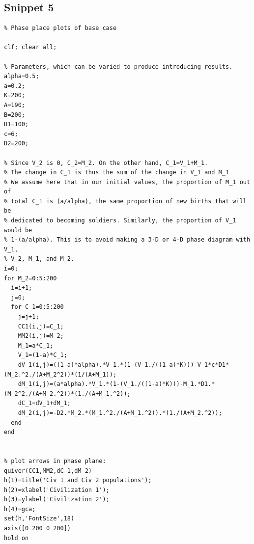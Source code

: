 \documentclass[12pt]{article}
\begin{document}
\subsection{Snippet 5}
\begin{verbatim}
% Phase place plots of base case

clf; clear all;

% Parameters, which can be varied to produce introducing results. 
alpha=0.5;
a=0.2;
K=200;
A=190;
B=200;
D1=100;
c=6;
D2=200;

% Since V_2 is 0, C_2=M_2. On the other hand, C_1=V_1+M_1.
% The change in C_1 is thus the sum of the change in V_1 and M_1
% We assume here that in our initial values, the proportion of M_1 out of
% total C_1 is (a/alpha), the same proportion of new births that will be
% dedicated to becoming soldiers. Similarly, the proportion of V_1 would be
% 1-(a/alpha). This is to avoid making a 3-D or 4-D phase diagram with V_1,
% V_2, M_1, and M_2. 
i=0;
for M_2=0:5:200
  i=i+1;
  j=0;
  for C_1=0:5:200
    j=j+1;
    CC1(i,j)=C_1;
    MM2(i,j)=M_2;
    M_1=a*C_1; 
    V_1=(1-a)*C_1;
    dV_1(i,j)=((1-a)*alpha).*V_1.*(1-(V_1./((1-a)*K)))-V_1*c*D1*(M_2.^2./(A+M_2^2))*(1/(A+M_1));
    dM_1(i,j)=(a*alpha).*V_1.*(1-(V_1./((1-a)*K)))-M_1.*D1.*(M_2^2./(A+M_2.^2))*(1./(A+M_1.^2));
    dC_1=dV_1+dM_1;
    dM_2(i,j)=-D2.*M_2.*(M_1.^2./(A+M_1.^2)).*(1./(A+M_2.^2));
  end
end


% plot arrows in phase plane:
quiver(CC1,MM2,dC_1,dM_2)
h(1)=title('Civ 1 and Civ 2 populations');
h(2)=xlabel('Civilization 1');
h(3)=ylabel('Civilization 2');
h(4)=gca;
set(h,'FontSize',18)
axis([0 200 0 200])
hold on
\end{verbatim}
\end{document}
